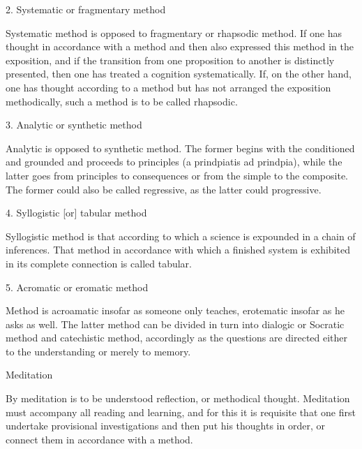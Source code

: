 2. Systematic or fragmentary method

Systematic method is opposed to fragmentary or rhapsodic method.
If one has thought in accordance with a method
and then also expressed this method in the exposition,
and if the transition from one proposition to
another is distinctly presented,
then one has treated a cognition systematically.
If, on the other hand, one has thought according to a method
but has not arranged the exposition methodically,
such a method is to be called rhapsodic.

3. Analytic or synthetic method

Analytic is opposed to synthetic method.
The former begins with the conditioned and grounded
and proceeds to principles (a prindpiatis ad prindpia),
while the latter goes from principles to consequences
or from the simple to the composite.
The former could also be called regressive,
as the latter could progressive.

4. Syllogistic [or] tabular method

Syllogistic method is that according to which
a science is expounded in a chain of inferences.
That method in accordance with which a finished system
is exhibited in its complete connection is called tabular.

5. Acromatic or eromatic method

Method is acroamatic insofar as someone only teaches,
erotematic insofar as he asks as well.
The latter method can be divided in turn
into dialogic or Socratic method and catechistic method,
accordingly as the questions are directed
either to the understanding or merely to memory.

Meditation

By meditation is to be understood reflection, or methodical thought.
Meditation must accompany all reading and learning,
and for this it is requisite that
one first undertake provisional investigations
and then put his thoughts in order,
or connect them in accordance with a method.
